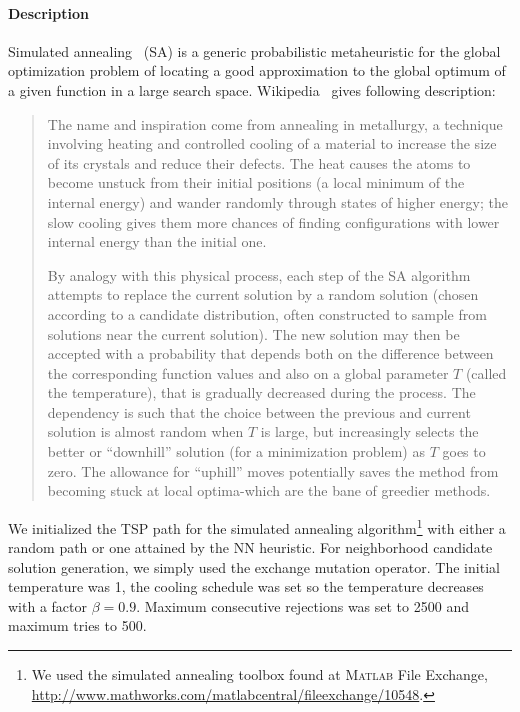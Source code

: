 \documentclass[a4paper,english,11pt,]{scrartcl}
\begin{document}
\paragraph{Description}
Simulated annealing~\cite{simulatedannealing} (SA) is a generic probabilistic metaheuristic for the global optimization problem of locating a good approximation to the global optimum of a given function in a large search space. 
Wikipedia~\cite{sawiki} gives following description:
\begin{quote}
The name and inspiration come from annealing in metallurgy, a technique involving heating and controlled cooling of a material to increase the size of its crystals and reduce their defects. The heat causes the atoms to become unstuck from their initial positions (a local minimum of the internal energy) and wander randomly through states of higher energy; the slow cooling gives them more chances of finding configurations with lower internal energy than the initial one.

By analogy with this physical process, each step of the SA algorithm attempts to replace the current solution by a random solution (chosen according to a candidate distribution, often constructed to sample from solutions near the current solution). The new solution may then be accepted with a probability that depends both on the difference between the corresponding function values and also on a global parameter $T$ (called the temperature), that is gradually decreased during the process. The dependency is such that the choice between the previous and current solution is almost random when $T$ is large, but increasingly selects the better or ``downhill'' solution (for a minimization problem) as $T$ goes to zero. The allowance for ``uphill'' moves potentially saves the method from becoming stuck at local optima-which are the bane of greedier methods. 
\end{quote}


We initialized the TSP path for the simulated annealing algorithm\footnote{We used the simulated annealing toolbox found at \textsc{Matlab} File Exchange, \url{http://www.mathworks.com/matlabcentral/fileexchange/10548}.} with either a random path or one attained by the NN heuristic.  For neighborhood candidate solution generation, we simply used the exchange mutation operator. The initial temperature was 1, the cooling schedule was set so the temperature decreases with a factor $\beta=0.9$. Maximum consecutive rejections was set to 2500 and maximum tries to 500.
                              
\end{document}
